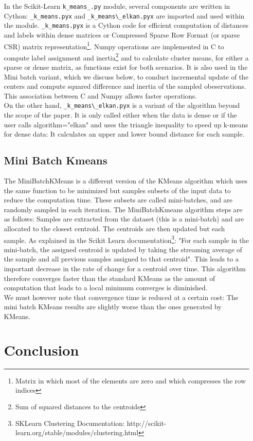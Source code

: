\documentclass[11pt]{article}
\begin{document}
\noindent In the Scikit-Learn \verb|k_means_.py| module, several components are written in Cython: \verb|_k_means.pyx| and \verb|_k_means\_elkan.pyx| are imported and used within the module. \verb|_k_means.pyx| is a Cython code for efficient computation of distances and labels within dense matrices or Compressed Sparse Row Format (or sparse CSR) matrix representation\footnote{Matrix in which most of the elements are zero and which compresses the row indices}. Numpy operations are implemented in C to compute label assignment and inertia\footnote{Sum of squared distances to the centroids} and to calculate cluster means, for either a sparse or dense matrix, as functions exist for both scenarios. It is also used in the Mini batch variant, which we discuss below, to conduct incremental update of the centers and compute squared difference and inertia of the sampled obeservations. This association between C and Numpy allows faster operations.\\

\noindent On the other hand, \verb|_k_means\_elkan.pyx| is a variant of the algorithm beyond the scope of the paper. It is only called either when the data is dense or if the user calls algorithm="elkan" and uses the triangle inequality to speed up k-means for dense data: It calculates an upper and lower bound distance for each sample. 

\subsection*{Mini Batch Kmeans}
The MiniBatchKMeans is a different version of the KMeans algorithm which uses the same function to be minimized but samples subsets of the input data to reduce the computation time. These subsets are called mini-batches, and are randomly sampled in each iteration. The MiniBatchKmeans algorithm steps are as follows: Samples are extracted from the dataset (this is a mini-batch) and are allocated to the closest centroid. The centroids are then updated but each sample. As explained in the Scikit Learn documentation\footnote{SKLearn Clustering Documentation: http://scikit-learn.org/stable/modules/clustering.html}:
"For each sample in the mini-batch, the assigned centroid is updated by taking the streaming average of the sample and all previous samples assigned to that centroid". 
This leads to a important decrease in the rate of change for a centroid over time. This algorithm therefore converges faster than the standard KMeans as the amount of computation that leads to a local minimum converges is diminished.\\

\noindent We must however note that convergence time is reduced at a certain cost: The mini batch KMeans results are slightly worse than the ones generated by KMeans.


\section*{Conclusion}
\end{document}
